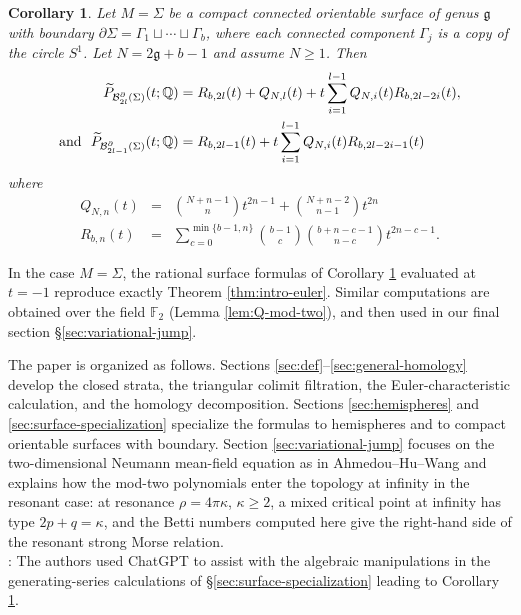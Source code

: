 \documentclass[11pt,a4paper]{article}
\numberwithin{equation}{section}
\newtheorem{cor}[thm]{Corollary}
\theoremstyle{definition}
\theoremstyle{remark}
\newcommand{\Q}{\mathbb{Q}}
\newcommand{\Si}{\Sigma}
\newcommand{\pa}{\partial}
\newcommand{\wt}{\widetilde}
\newcommand{\BB}{\mathcal B}
\newcommand{\mfg}{\mathfrak g}
\begin{document}
\begin{cor}\label{surface-case} Let \(M=\Si\) be a compact connected orientable surface of genus \(\mathfrak g\) with boundary
$
\pa\Si=\Gamma_1\sqcup\cdots\sqcup\Gamma_b$, where each connected component $\Gamma_j$ is a copy of the circle $S^1$. Let $N=2\mfg + b-1$ and assume $N\geq 1$.
Then
\begin{align*}
\wt P_{\BB_{2l}^{\pa}(\Si)}(t;\Q)
&=
R_{b,2l}(t)+Q_{N,l}(t)
+t\sum_{i=1}^{l-1}
Q_{N,i}(t)R_{b,2l-2i}(t),
\\
\hbox{and}\ \ \wt P_{\BB_{2l-1}^{\pa}(\Si)}(t;\Q)
&=
R_{b,2l-1}(t)
+t\sum_{i=1}^{l-1}
Q_{N,i}(t)R_{b,2l-2i-1}(t)
\end{align*}
where
\begin{eqnarray*}
Q_{N,n}(t)
&=&
\binom{N+n-1}{n}t^{2n-1}
+
\binom{N+n-2}{n-1}t^{2n}\\
R_{b,n}(t)&=&
\sum_{c=0}^{\min\{b-1,n\}}
\binom{b-1}{c}\binom{b+n-c-1}{n-c}t^{2n-c-1}.
\end{eqnarray*}
\end{cor}

In the case $M=\Sigma$, the rational surface formulas of Corollary \ref{surface-case} evaluated at \(t=-1\) reproduce exactly Theorem \ref{thm:intro-euler}.
Similar computations are obtained over the field $\mathbb F_2$ (Lemma \ref{lem:Q-mod-two}), and then used in our final section \S\ref{sec:variational-jump}.

The paper is organized as follows.  Sections \ref{sec:def}--\ref{sec:general-homology} develop the closed strata, the triangular colimit filtration, the Euler-characteristic calculation, and the homology decomposition.  Sections \ref{sec:hemispheres} and \ref{sec:surface-specialization} specialize the formulas to hemispheres and to compact orientable surfaces with boundary. Section \ref{sec:variational-jump}
 focuses on the two-dimensional Neumann mean-field equation as in Ahmedou--Hu--Wang \cite{AHW2026} and explains how the mod-two polynomials enter the topology at infinity in the resonant case: at resonance \(\rho=4\pi\kappa\), \(\kappa\ge2\), a mixed critical point at infinity has type \(2p+q=\kappa\), and the Betti numbers computed here give the right-hand side of the resonant strong Morse relation.\\
 
 \vskip 5pt
: The authors used ChatGPT to assist with the algebraic manipulations in the generating-series calculations of \S\ref{sec:surface-specialization} leading to Corollary \ref{surface-case}. 
 \vskip 5pt
\end{document}
